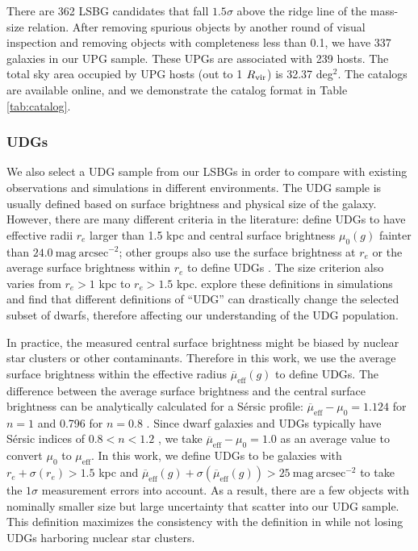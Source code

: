 \documentclass[twocolumn,astrosymb,twocolappendix]{aastex631}
\newcommand{\sbunit}{\mathrm{mag\ arcsec}^{-2}}
\newcommand{\sbeff}{\overline{\mu}_{\mathrm{eff}}(g)}
\newcommand{\sersic}{S\'ersic}
\begin{document}
\begin{CJK*}{UTF8}{gbsn}
There are 362 LSBG candidates that fall $1.5\sigma$ above the ridge line of the mass-size relation. After removing spurious objects by another round of visual inspection and removing objects with completeness less than 0.1, we have 337 galaxies in our UPG sample. These UPGs are associated with 239 hosts. The total sky area occupied by UPG hosts (out to 1 $R_{\rm{vir}}$) is 32.37 deg$^{2}$. The catalogs are available online, and we demonstrate the catalog format in Table \ref{tab:catalog}.

\subsubsection{UDGs}
We also select a UDG sample from our LSBGs in order to compare with existing observations and simulations in different environments. The UDG sample is usually defined based on surface brightness and physical size of the galaxy. However, there are many different criteria in the literature: \citet{vanDokkum2015} define UDGs to have effective radii $r_e$ larger than 1.5 kpc and central surface brightness $\mu_0(g)$ fainter than $24.0\ \sbunit$; other groups also use the surface brightness at $r_e$ \citep[e.g.,][]{DiCintio2017,Cardona-Barrero2020} or the average surface brightness within $r_e$ to define UDGs \citep[e.g.,][]{Koda2015,Yagi2016,vdBurg2016,Leisman2017,Martin2019}. The size criterion also varies from $r_e > 1$ kpc to $r_e > 1.5$ kpc. \citet{vanNest2022} explore these definitions in simulations and find that different definitions of ``UDG'' can drastically change the selected subset of dwarfs, therefore affecting our understanding of the UDG population.

In practice, the measured central surface brightness might be biased by nuclear star clusters \citep{Neumayer2020,ELVES-II,Somalwar2020} or other contaminants. Therefore in this work, we use the average surface brightness within the effective radius $\sbeff$ to define UDGs. The difference between the average surface brightness and the central surface brightness can be analytically calculated for a \sersic{} profile: $\overline{\mu}_{\mathrm{eff}} - \mu_0 = 1.124$ for $n=1$ and 0.796 for $n=0.8$ \citep{Graham2005,Yagi2016}. Since dwarf galaxies and UDGs typically have \sersic{} indices of $0.8 < n < 1.2$ \citep[e.g.,][]{vanDokkum2015,ELVES-I}, we take $\overline{\mu}_{\mathrm{eff}} - \mu_0 = 1.0$ as an average value to convert $\mu_0$ to $\mu_{\mathrm{eff}}$. In this work, we define UDGs to be galaxies with $r_e+\sigma(r_e) > 1.5$ kpc and $\sbeff + \sigma(\sbeff) > 25\ \sbunit$ to take the $1\sigma$ measurement errors into account. As a result, there are a few objects with nominally smaller size but large uncertainty that scatter into our UDG sample. This definition maximizes the consistency with the definition in \citet{vanDokkum2015} while not losing UDGs harboring nuclear star clusters.


\end{CJK*}
\end{document}
